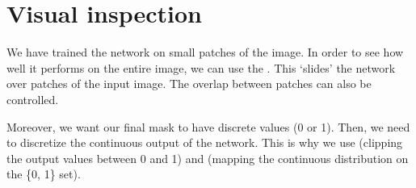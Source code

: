 \documentclass[letterpaper,10pt,english]{jupyterBook}
\begin{document}
\section{Visual inspection}
\label{\detokenize{notebooks/Tutorial3_Segmentation/Tutorial3_Segmentation_student:visual-inspection}}
\sphinxAtStartPar
We have trained the network on small patches of the image. In order to see how well it performs on the entire image, we can use the . This ‘slides’ the network over patches of the input image. The overlap between patches can also be controlled.

\sphinxAtStartPar


\sphinxAtStartPar
Moreover, we want our final mask to have discrete values (0 or 1). Then, we need to discretize the continuous output of the network. This is why we use  (clipping the output values between 0 and 1) and  (mapping the continuous distribution on the \{0, 1\} set).
\end{document}
